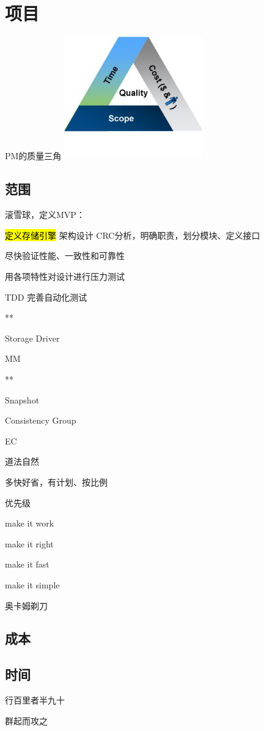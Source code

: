 \chapter{项目}

PM的质量三角
\includegraphics[width=6cm]{../imgs/quality.jpeg}

\section{范围}

滚雪球，定义MVP：
\begin{enumbox}
\item \hl{定义存储引擎} 架构设计 CRC分析，明确职责，划分模块、定义接口
\item 尽快验证性能、一致性和可靠性
\item 用各项特性对设计进行压力测试
\item TDD 完善自动化测试
\item ***
\item Storage Driver
\item MM
\item ***
\item Snapshot
\item Consistency Group
\item EC
\end{enumbox}

道法自然

多快好省，有计划、按比例

优先级
\begin{enumbox}
\item make it work
\item make it right
\item make it fast
\item make it simple
\end{enumbox}

奥卡姆剃刀

\section{成本}

\section{时间}

行百里者半九十

群起而攻之
